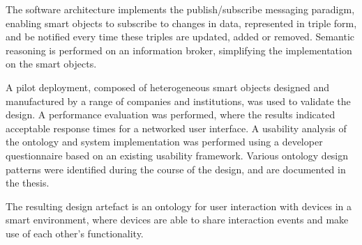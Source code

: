 The software architecture implements the publish/subscribe messaging paradigm, enabling smart objects to subscribe to changes in data, represented in triple form, and be notified every time these triples are updated, added or removed. Semantic reasoning is performed on an information broker, simplifying the implementation on the smart objects.

A pilot deployment, composed of heterogeneous smart objects designed and manufactured by a range of companies and institutions, was used to validate the design. A performance evaluation was performed, where the results indicated acceptable response times for a networked user interface. A usability analysis of the ontology and system implementation was performed using a developer questionnaire based on an existing usability framework. Various ontology design patterns were identified during the course of the design, and are documented in the thesis.

The resulting design artefact is an ontology for user interaction with devices in a smart environment, where devices are able to share interaction events and make use of each other's functionality.


% 


\endgroup			

\vfill